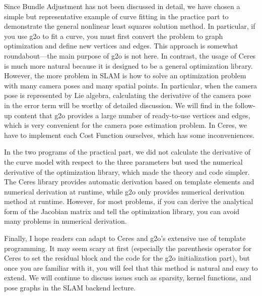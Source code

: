 Since Bundle Adjustment has not been discussed in detail, we have chosen a simple but representative example of curve fitting in the practice part to demonstrate the general nonlinear least squares solution method. In particular, if you use g2o to fit a curve, you must first convert the problem to graph optimization and define new vertices and edges. This approach is somewhat roundabout—the main purpose of g2o is not here. In contrast, the usage of Ceres is much more natural because it is designed to be a general optimization library. However, the more problem in SLAM is how to solve an optimization problem with many camera poses and many spatial points. In particular, when the camera pose is represented by Lie algebra, calculating the derivative of the camera pose in the error term will be worthy of detailed discussion. We will find in the follow-up content that g2o provides a large number of ready-to-use vertices and edges, which is very convenient for the camera pose estimation problem. In Ceres, we have to implement each Cost Function ourselves, which has some inconveniences.

In the two programs of the practical part, we did not calculate the derivative of the curve model with respect to the three parameters but used the numerical derivative of the optimization library, which made the theory and code simpler. The Ceres library provides automatic derivation based on template elements and numerical derivation at runtime, while g2o only provides numerical derivation method at runtime. However, for most problems, if you can derive the analytical form of the Jacobian matrix and tell the optimization library, you can avoid many problems in numerical derivation.

Finally, I hope readers can adapt to Ceres and g2o's extensive use of template programming. It may seem scary at first (especially the parenthesis operator for Ceres to set the residual block and the code for the g2o initialization part), but once you are familiar with it, you will feel that this method is natural and easy to extend. We will continue to discuss issues such as sparsity, kernel functions, and pose graphs in the SLAM backend lecture.

